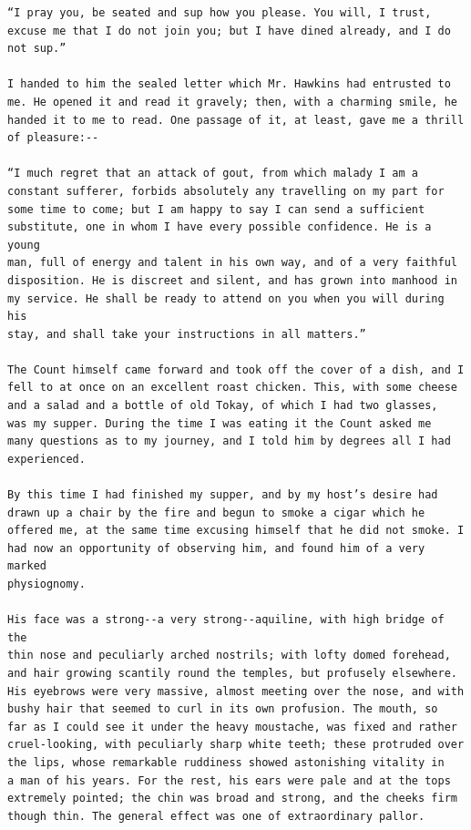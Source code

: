 \documentclass{article}
\begin{document}
\begin{verbatim}
“I pray you, be seated and sup how you please. You will, I trust,
excuse me that I do not join you; but I have dined already, and I do
not sup.”

I handed to him the sealed letter which Mr. Hawkins had entrusted to
me. He opened it and read it gravely; then, with a charming smile, he
handed it to me to read. One passage of it, at least, gave me a thrill
of pleasure:--

“I much regret that an attack of gout, from which malady I am a
constant sufferer, forbids absolutely any travelling on my part for
some time to come; but I am happy to say I can send a sufficient
substitute, one in whom I have every possible confidence. He is a young
man, full of energy and talent in his own way, and of a very faithful
disposition. He is discreet and silent, and has grown into manhood in
my service. He shall be ready to attend on you when you will during his
stay, and shall take your instructions in all matters.”

The Count himself came forward and took off the cover of a dish, and I
fell to at once on an excellent roast chicken. This, with some cheese
and a salad and a bottle of old Tokay, of which I had two glasses,
was my supper. During the time I was eating it the Count asked me
many questions as to my journey, and I told him by degrees all I had
experienced.

By this time I had finished my supper, and by my host’s desire had
drawn up a chair by the fire and begun to smoke a cigar which he
offered me, at the same time excusing himself that he did not smoke. I
had now an opportunity of observing him, and found him of a very marked
physiognomy.

His face was a strong--a very strong--aquiline, with high bridge of the
thin nose and peculiarly arched nostrils; with lofty domed forehead,
and hair growing scantily round the temples, but profusely elsewhere.
His eyebrows were very massive, almost meeting over the nose, and with
bushy hair that seemed to curl in its own profusion. The mouth, so
far as I could see it under the heavy moustache, was fixed and rather
cruel-looking, with peculiarly sharp white teeth; these protruded over
the lips, whose remarkable ruddiness showed astonishing vitality in
a man of his years. For the rest, his ears were pale and at the tops
extremely pointed; the chin was broad and strong, and the cheeks firm
though thin. The general effect was one of extraordinary pallor.


\end{verbatim}
\end{document}
